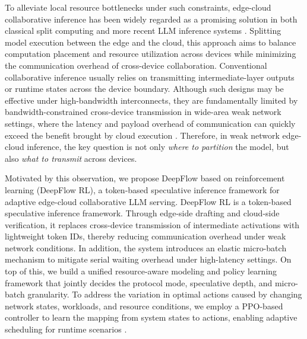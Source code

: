 \documentclass[a4paper,fleqn]{cas-dc}
\begin{document}
To alleviate local resource bottlenecks under such constraints, edge-cloud collaborative inference has been widely regarded as a promising solution in both classical split computing and more recent LLM inference systems \cite{kang2017neurosurgeon,patel2024splitwise,mudvari2024splitllm,chen2025adaptivelayersplitting}. Splitting model execution between the edge and the cloud, this approach aims to balance computation placement and resource utilization across devices while minimizing the communication overhead of cross-device collaboration. Conventional collaborative inference usually relies on transmitting intermediate-layer outputs or runtime states across the device boundary. Although such designs may be effective under high-bandwidth interconnects, they are fundamentally limited by bandwidth-constrained cross-device transmission in wide-area weak network settings, where the latency and payload overhead of communication can quickly exceed the benefit brought by cloud execution \cite{kang2017neurosurgeon,patel2024splitwise,mudvari2024splitllm}. Therefore, in weak network edge-cloud inference, the key question is not only \emph{where to partition} the model, but also \emph{what to transmit} across devices.

Motivated by this observation, we propose DeepFlow based on reinforcement learning (DeepFlow RL), a token-based speculative inference framework for adaptive edge-cloud collaborative LLM serving. DeepFlow RL is a token-based speculative inference framework. Through edge-side drafting and cloud-side verification, it replaces cross-device transmission of intermediate activations with lightweight token IDs, thereby reducing communication overhead under weak network conditions. In addition, the system introduces an elastic micro-batch mechanism to mitigate serial waiting overhead under high-latency settings. On top of this, we build a unified resource-aware modeling and policy learning framework that jointly decides the protocol mode, speculative depth, and micro-batch granularity. To address the variation in optimal actions caused by changing network states, workloads, and resource conditions, we employ a PPO-based controller to learn the mapping from system states to actions, enabling adaptive scheduling for runtime scenarios \cite{schulman2017ppo,qin2026twostageppo,fu2024efficient_llm_scheduling}.
\end{document}
